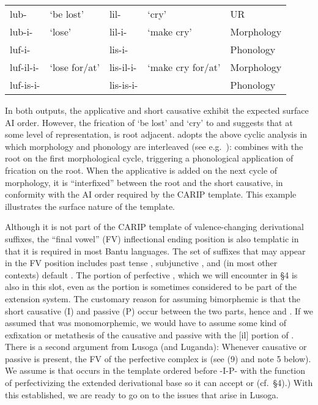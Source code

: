 \documentclass[output=paper,
modfonts
]{LSP/langsci}
\begin{document}
\ea
\begin{tabular}[t]{@{}lllll}
	lub-  & `be lost' & lil-  & `cry' & UR \\
	lub-i- & `lose' & lil-i- & `make cry' & Morphology \\
	luf-i- &       & lis-i- &       & Phonology \\
	luf-il-i- & `lose for/at' & lis-il-i- & `make cry for/at' & Morphology \\
	luf-is-i- &       & lis-is-i- &       & Phonology \\
\end{tabular}%
\z


In both outputs, the applicative and short causative exhibit the
expected surface AI order. However, the frication of  `be
lost' and  `cry' to  and  suggests that
at some level of representation,  is root adjacent. \citet{hyman1994} adopts the above cyclic analysis in which morphology and
phonology are interleaved (see e.g.\ \citealt{kiparsky1982h}):  combines
with the root on the first morphological cycle, triggering a
phonological application of frication on the root. When the applicative
is added on the next cycle of morphology, it is ``interfixed'' between
the root and the short causative, in conformity with the AI order
required by the CARIP template. This example illustrates the surface
nature of the template.

Although it is not part of the CARIP template of valence-changing
derivational suffixes, the ``final vowel'' (FV) inflectional ending
position is also templatic in that it is required in most Bantu
languages. The set of suffixes that may appear in the FV position
includes past tense , subjunctive , and (in most
other contexts) default . The  portion of perfective
, which we will encounter in §4 is also in this slot, even
as the  portion is sometimes considered to be part of the
extension system. The customary reason for assuming bimorphemic
 is that the short causative (I) and passive (P) occur
between the two parts, hence  and  \citep{bastin1983}. If we assumed that  was monomorphemic, we would have
to assume some kind of exfixation or metathesis of the causative and
passive with the {[}il{]} portion of . There is a second
argument from Lusoga (and Luganda): Whenever causative  or
passive  is present, the FV of the perfective complex is
 (see (9) and note 5 below). We assume is that 
occurs in the template ordered before -I-P- with the function of
perfectivizing the extended derivational base so it can accept 
or  (cf.\ §4).) With this established, we are ready to go on to
the issues that arise in Lusoga.
\end{document}
